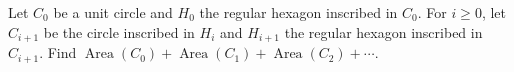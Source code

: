 Let $C_0$ be a unit circle and $H_0$ the regular hexagon inscribed in $C_0$. For $i\ge0$, let $C_{i+1}$ be the circle inscribed in $H_i$ and $H_{i+1}$ the regular hexagon inscribed in $C_{i+1}$. Find $\operatorname{Area}(C_0)+\operatorname{Area}(C_1)+\operatorname{Area}(C_2)+\cdots$.
